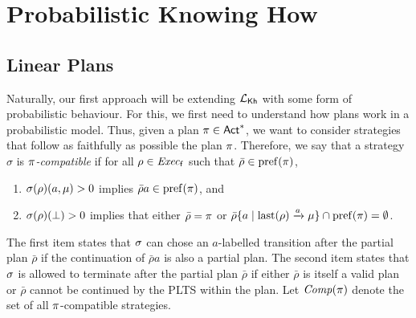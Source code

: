 \section{Probabilistic Knowing How}

\subsection{Linear Plans}

Naturally, our first approach will be extending $\mathcal{L}_{{\mathsf{Kh}}}$ with some
form of probabilistic behaviour.  For this, we first need to
understand how plans work in a probabilistic model.
%
Thus, given a plan $\pi\in{\rm \sf Act}^*$, we want to consider
strategies that follow as faithfully as possible the plan
$\pi$.  Therefore, we say that a strategy $\sigma$ is
\emph{$\pi$-compatible} if for all $\rho\in\mathit{Exec}_{\mathsf{f}}$ such that
$\bar{\rho}\in\mathrm{pref}(\pi)$,
%
\begin{enumerate}
\item%
  $\sigma(\rho)(a,\mu)>0$ implies $\bar{\rho}a\in\mathrm{pref}(\pi)$, and
\item%
  $\sigma(\rho)(\bot)>0$ implies that either
  $\bar{\rho}=\pi$ or
  $\bar{\rho}\{a\mid{\mathrm{last}(\rho)\xrightarrow{a}\mu}\}\cap\mathrm{pref}(\pi) = \emptyset$. 
\end{enumerate}
%
The first item states that $\sigma$ can chose an $a$-labelled
transition after the partial plan $\bar{\rho}$ if the continuation of
$\bar{\rho}a$ is also a partial plan.
%
The second item states that $\sigma$ is allowed to terminate after the
partial plan $\bar{\rho}$ if either $\bar{\rho}$ is itself a valid
plan or $\bar{\rho}$ cannot be continued by the PLTS within the plan.
%
Let $\mathit{Comp}(\pi)$ denote the set of all $\pi$-compatible
strategies.


